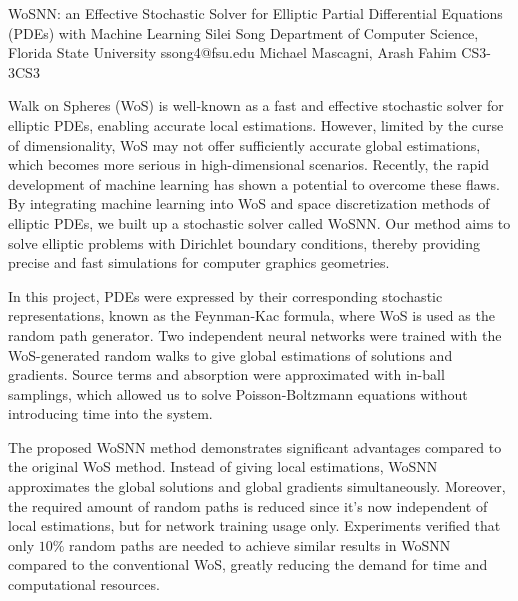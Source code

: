 \begin{talk}
  {WoSNN: an Effective Stochastic Solver for Elliptic Partial Differential Equations (PDEs) with Machine Learning}%
  {Silei Song}%
  {Department of Computer Science, Florida State University}%
  {ssong4@fsu.edu}%
  {Michael Mascagni, Arash Fahim}%
{}{}{CS3-3}{CS3}

			

Walk on Spheres (WoS) is well-known as a fast and effective stochastic solver for elliptic PDEs, enabling accurate local estimations. However, limited by the curse of dimensionality, WoS may not offer sufficiently accurate global estimations, which becomes more serious in high-dimensional scenarios. Recently, the rapid development of machine learning has shown a potential to overcome these flaws. By integrating machine learning into WoS and space discretization methods of elliptic PDEs, we built up a stochastic solver called WoSNN. Our method aims to solve elliptic problems with Dirichlet boundary conditions, thereby providing precise and fast simulations for computer graphics geometries.

In this project, PDEs were expressed by their corresponding stochastic representations, known as the Feynman-Kac formula, where WoS is used as the random path generator. Two independent neural networks were trained with the WoS-generated random walks to give global estimations of solutions and gradients. Source terms and absorption were approximated with in-ball samplings, which allowed us to solve Poisson-Boltzmann equations without introducing time into the system.

The proposed WoSNN method demonstrates significant advantages compared to the original WoS method. Instead of giving local estimations, WoSNN approximates the global solutions and global gradients simultaneously. Moreover, the required amount of random paths is reduced since it's now independent of local estimations, but for network training usage only. Experiments verified that only $10\%$ random paths are needed to achieve similar results in WoSNN compared to the conventional WoS, greatly reducing the demand for time and computational resources. 

\medskip

\end{talk}

